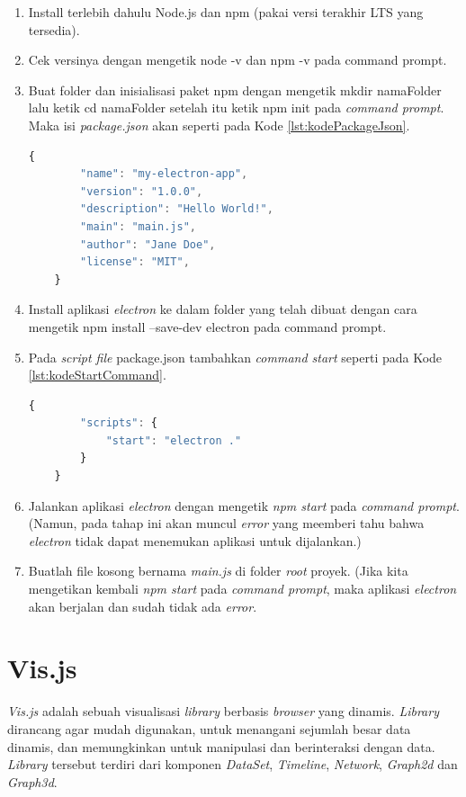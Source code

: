 \begin{enumerate}
    \item Install terlebih dahulu Node.js dan npm (pakai versi terakhir LTS yang tersedia).
    \item Cek versinya dengan mengetik node -v dan npm -v pada command prompt.
    \item Buat folder dan inisialisasi paket npm dengan mengetik mkdir namaFolder lalu ketik cd namaFolder setelah itu ketik npm init pada \textit{command prompt}. Maka isi \textit{package.json} akan seperti pada Kode \ref{lst:kodePackageJson}.
    
    \begin{lstlisting}[language=JavaScript, caption=Package.json\label{lst:kodePackageJson}]
    {
        "name": "my-electron-app",
        "version": "1.0.0",
        "description": "Hello World!",
        "main": "main.js",
        "author": "Jane Doe",
        "license": "MIT",
    }
    \end{lstlisting}
    \item Install aplikasi \textit{electron} ke dalam folder yang telah dibuat dengan cara mengetik npm install --save-dev electron pada command prompt.
    \item Pada \textit{script file} package.json tambahkan \textit{command start} seperti pada Kode \ref{lst:kodeStartCommand}.
    
    \begin{lstlisting}[language=JavaScript, caption=\textit{Start command}\label{lst:kodeStartCommand}]
    {
        "scripts": {
            "start": "electron ."
        }
    }
    \end{lstlisting}
    \item Jalankan aplikasi \textit{electron} dengan mengetik \textit{npm start} pada \textit{command prompt}.
    (Namun, pada tahap ini akan muncul \textit{error} yang meemberi tahu bahwa \textit{electron} tidak dapat menemukan aplikasi untuk dijalankan.)
    \item Buatlah file kosong bernama \textit{main.js} di folder \textit{root} proyek. (Jika kita mengetikan kembali \textit{npm start} pada \textit{command prompt}, maka aplikasi \textit{electron} akan berjalan dan sudah tidak ada \textit{error}.
    
\end{enumerate}

\newpage
\section{Vis.js}
\textit{Vis.js} adalah sebuah visualisasi \textit{library} berbasis \textit{browser} yang dinamis. \textit{Library} dirancang agar mudah digunakan, untuk menangani sejumlah besar data dinamis, dan memungkinkan untuk manipulasi dan berinteraksi dengan data. \textit{Library} tersebut terdiri dari komponen \textit{DataSet}, \textit{Timeline}, \textit{Network}, \textit{Graph2d} dan \textit{Graph3d}. \cite{visjs}

